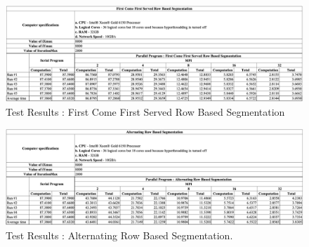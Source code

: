 \documentclass[conference]{IEEEtran}
\begin{document}
	\begin{figure}
	\centering
	\includegraphics[width=\textheight,height=\textwidth,keepaspectratio]{FCFSCal}
	\caption{Test Results : First Come First Served Row Based Segmentation}
	\label{fig:PropProf}
\end{figure}
\newpage
	\begin{figure}
	\centering
	\includegraphics[width=\textheight,height=\textwidth,keepaspectratio]{AlCal}
	\caption{Test Results : Alternating Row Based Segmentation.}
	\label{fig:PropProf}
\end{figure}
\newpage
\end{document}
